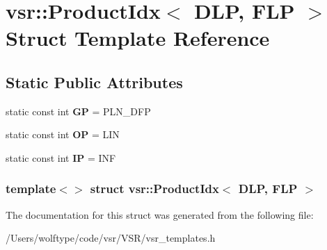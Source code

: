 \hypertarget{structvsr_1_1_product_idx_3_01_d_l_p_00_01_f_l_p_01_4}{\section{vsr\-:\-:Product\-Idx$<$ D\-L\-P, F\-L\-P $>$ Struct Template Reference}
\label{structvsr_1_1_product_idx_3_01_d_l_p_00_01_f_l_p_01_4}
}
\subsection*{Static Public Attributes}
\begin{DoxyCompactItemize}
\item 
\hypertarget{structvsr_1_1_product_idx_3_01_d_l_p_00_01_f_l_p_01_4_a1008dd85524ee701b594276325bc64c1}{static const int {\bfseries G\-P} = P\-L\-N\-\_\-\-D\-F\-P}\label{structvsr_1_1_product_idx_3_01_d_l_p_00_01_f_l_p_01_4_a1008dd85524ee701b594276325bc64c1}

\item 
\hypertarget{structvsr_1_1_product_idx_3_01_d_l_p_00_01_f_l_p_01_4_a3c3f7dceac693b8a2786e2cf5fa49fcb}{static const int {\bfseries O\-P} = L\-I\-N}\label{structvsr_1_1_product_idx_3_01_d_l_p_00_01_f_l_p_01_4_a3c3f7dceac693b8a2786e2cf5fa49fcb}

\item 
\hypertarget{structvsr_1_1_product_idx_3_01_d_l_p_00_01_f_l_p_01_4_a2d61d1e3d3904b8638961db9fe7a8e3d}{static const int {\bfseries I\-P} = I\-N\-F}\label{structvsr_1_1_product_idx_3_01_d_l_p_00_01_f_l_p_01_4_a2d61d1e3d3904b8638961db9fe7a8e3d}

\end{DoxyCompactItemize}
\subsubsection*{template$<$$>$ struct vsr\-::\-Product\-Idx$<$ D\-L\-P, F\-L\-P $>$}



The documentation for this struct was generated from the following file\-:\begin{DoxyCompactItemize}
\item 
/\-Users/wolftype/code/vsr/\-V\-S\-R/vsr\-\_\-templates.\-h\end{DoxyCompactItemize}
